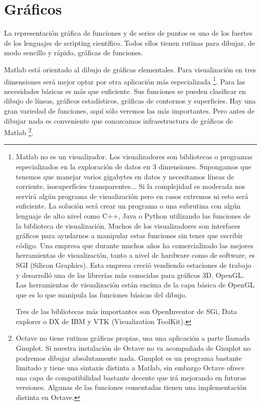 

\chapter{Gráficos}


La representación gráfica de funciones y de series de puntos es uno
de los fuertes de los lenguajes de scripting científico. Todos ellos
tienen rutinas para dibujar, de modo sencillo y rápido, gráficas de
funciones.

Matlab está orientado al dibujo de gráficas elementales. Para visualización
en tres dimensiones será mejor optar por otra aplicación más especializada%
\footnote{Matlab no es un visualizador. Los visualizadores son bibliotecas o
programas especializados en la exploración de datos en 3 dimensiones.
Supongamos que tenemos que manejar varios gigabytes en datos y necesitamos
líneas de corriente, isosuperfícies transparentes... Si la complejidad
es moderada nos servirá algún programa de visualización pero en casos
extremos ni esto será suficiente. La solución será crear un programa
o una subrutina con algún lenguaje de alto nivel como C++, Java o
Python utilizando las funciones de la biblioteca de visualización.
Muchos de los visualizadores son interfaces gráficos para ayudarnos
a manipular estas funciones sin tener que escribir código. Una empresa
que durante muchos años ha comercializado las mejores herramientas
de visualización, tanto a nivel de hardware como de software, es SGI
(Silicon Graphics). Esta empresa creció vendiendo estaciones de trabajo
y desarrolló una de las librerías más conocidas para gráficos 3D,
OpenGL. Las herramientas de visualización están encima de la capa
básica de OpenGL que es lo que manipula las funciones básicas del
dibujo.

Tres de las bibliotecas más importantes son OpenInventor de SGi, Data
explorer o DX de IBM y VTK (Visualization ToolKit). %
}. Para las necesidades básicas es más que suficiente. Sus funciones
se pueden clasificar en dibujo de líneas, gráficos estadísticos, gráficas
de contornos y superficies. Hay una gran variedad de funciones, aquí
sólo veremos las más importantes. Pero antes de dibujar nada es conveniente
que conozcamos infraestructura de gráficos de Matlab%
\footnote{Octave no tiene rutinas gráficas propias, usa una aplicación a parte
llamada Gnuplot. Si nuestra instalación de Octave no va acompañada
de Gnuplot no podremos dibujar absolutamente nada. Gnuplot es un programa
bastante limitado y tiene una sintaxis distinta a Matlab, sin embargo
Octave ofrece una capa de compatibilidad bastante decente que irá
mejorando en futuras versiones. Algunas de las funciones comentadas
tienen una implementación distinta en Octave.%
}.


